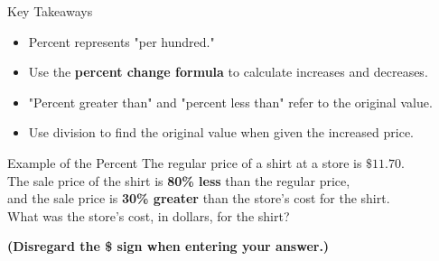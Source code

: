 \documentclass{beamer}
\begin{document}
\begin{frame}{Key Takeaways}
    \begin{itemize}
        \item Percent represents "per hundred."
        \item Use the \textbf{percent change formula} to calculate increases and decreases.
        \item "Percent greater than" and "percent less than" refer to the original value.
        \item Use division to find the original value when given the increased price.
    \end{itemize}
\end{frame}


\begin{frame}{{Example of the Percent}}
    The regular price of a shirt at a store is \(\mathbf{\$11.70}\). \\
    The sale price of the shirt is \textbf{80\% less} than the regular price, \\
    and the sale price is \textbf{30\% greater} than the store’s cost for the shirt. \\
    
    What was the store’s cost, in dollars, for the shirt? 

    \textbf{(Disregard the \$ sign when entering your answer.)}
\end{frame}
\end{document}
